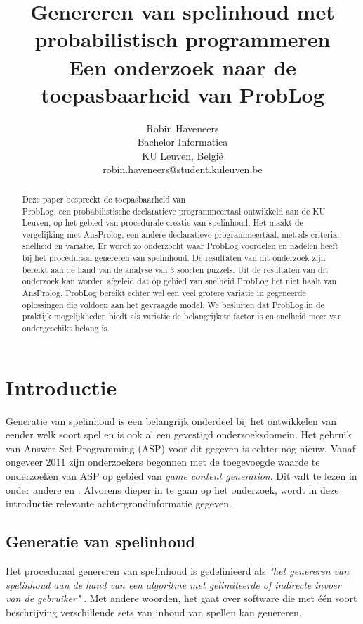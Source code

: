\documentclass{article}
\title{Genereren van spelinhoud met probabilistisch programmeren \\ \Large{Een onderzoek naar de toepasbaarheid van ProbLog}}
\author{Robin Haveneers \\
Bachelor Informatica\\
KU Leuven, Belgi\"e \\
robin.haveneers@student.kuleuven.be}
\begin{document}
\maketitle

\begin{abstract}
Deze paper bespreekt de toepasbaarheid van \\ProbLog, een probabilistische declaratieve programmeertaal ontwikkeld aan de KU Leuven, op het gebied van procedurale creatie van spelinhoud. Het maakt de vergelijking met AnsProlog, een andere declaratieve programmeertaal, met als criteria: snelheid en variatie. Er wordt zo onderzocht waar ProbLog voordelen en nadelen heeft bij het proceduraal genereren van spelinhoud. De resultaten van dit onderzoek zijn bereikt aan de hand van de analyse van 3 soorten puzzels. Uit de resultaten van dit onderzoek kan worden afgeleid dat op gebied van snelheid ProbLog het niet haalt van AnsProlog. ProbLog bereikt echter wel een veel grotere variatie in gegeneerde oplossingen die voldoen aan het gevraagde model. We besluiten dat ProbLog in de praktijk mogelijkheden biedt als variatie de belangrijkste factor is en snelheid meer van ondergeschikt belang is.
\end{abstract}

\section{Introductie}
Generatie van spelinhoud is een belangrijk onderdeel bij het ontwikkelen van eender welk soort spel en is ook al een gevestigd onderzoeksdomein. Het gebruik van Answer Set Programming (ASP) voor dit gegeven is echter nog nieuw. Vanaf ongeveer 2011 zijn onderzoekers begonnen met de toegevoegde waarde te onderzoeken van ASP op gebied van \textit{game content generation}. Dit valt te lezen in onder andere \cite{yannakakis} en \cite{smith}. Alvorens dieper in te gaan op het onderzoek, wordt in deze introductie relevante achtergrondinformatie gegeven.

	\subsection{Generatie van spelinhoud}
	Het proceduraal genereren van spelinhoud is gedefinieerd als \textit{"het genereren van spelinhoud aan de hand van een algoritme met gelimiteerde of indirecte invoer van de gebruiker"} \cite{togelius2015introduction}. Met andere woorden, het gaat over software die met \'e\'en soort beschrijving verschillende sets van inhoud van spellen kan genereren.
	
\end{document}
